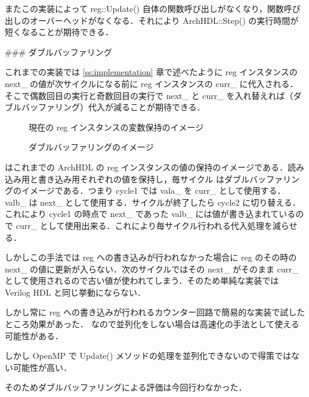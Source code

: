 またこの実装によって reg::Update() 自体の関数呼び出しがなくなり，関数呼び出しのオーバーヘッドがなくなる．それにより ArchHDL::Step() の実行時間が短くなることが期待できる．


### ダブルバッファリング

これまでの実装では \ref{ss:implementation} 章で述べたように
reg インスタンスの next_ の値が次サイクルになる前に reg インスタンスの curr_ に代入される．
そこで偶数回目の実行と奇数回目の実行で next_ と curr_
を入れ替えれば（ダブルバッファリング）代入が減ることが期待できる．

\begin{figure}[t]
 \begin{center}
  
 \end{center}
 \caption{現在の reg インスタンスの変数保持のイメージ}
 \label{fig:reg_curr_next}
\end{figure}

\begin{figure}[t]
 \begin{center}
  
 \end{center}
 \caption{ダブルバッファリングのイメージ}
 \label{fig:double_buffer}
\end{figure}

 はこれまでの ArchHDL の reg インスタンスの値の保持のイメージである．読み込み用と書き込み用それぞれの値を保持し，毎サイクル
 はダブルバッファリングのイメージである．つまり cycle1 では vala_ を curr_ として使用する．valb_ は next_ として使用する．サイクルが終了したら cycle2 に切り替える．これにより cycle1 の時点で next_ であった valb_ には値が書き込まれているので curr_ として使用出来る．これにより毎サイクル行われる代入処理を減らせる．

しかしこの手法では reg への書き込みが行われなかった場合に
reg のその時の next_ の値に更新が入らない．次のサイクルではその next_ がそのまま
curr_ として使用されるので古い値が使われてしまう．そのため単純な実装では Verilog HDL と同じ挙動にならない．

しかし常に reg への書き込みが行われるカウンター回路で簡易的な実装で試したところ効果があった．
なので並列化をしない場合は高速化の手法として使える可能性がある．

しかし OpenMP で Update() メソッドの処理を並列化できないので得策ではない可能性が高い．

そのためダブルバッファリングによる評価は今回行わなかった．




